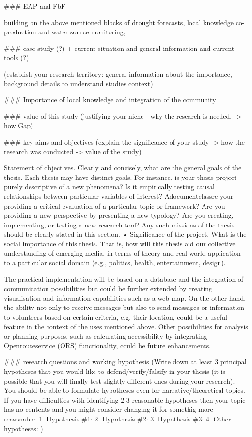 \#\#\# EAP and FbF

building on the above mentioned blocks of drought forecasts, local knowledge co-production and water source monitoring, 

\#\#\# case study (?) + current situation and general information and current tools (?)

(establish your research territory: general information about the importance, background details to understand studies context)


\#\#\# Importance of local knowledge and integration of the community

\#\#\# value of this study
(justifying your niche - why the research is needed. -> how Gap)

\#\#\# key aims and objectives
(explain the significance of your study -> how the research was conducted -> value of the study)

Statement of objectives. Clearly and concisely, what are the general goals of the
thesis. Each thesis may have distinct goals. For instance, is your thesis project purely
descriptive of a new phenomena? Is it empirically testing causal relationships
between particular variables of interest? Adocumentclassre your providing a critical evaluation of a
particular topic or framework? Are you providing a new perspective by presenting a
new typology? Are you creating, implementing, or testing a new research tool? Any
such missions of the thesis should be clearly stated in this section.
• Significance of the project. What is the social importance of this thesis. That is, how
will this thesis aid our collective understanding of emerging media, in terms of
theory and real-world application to a particular social domain (e.g., politics, health,
entertainment, design).




The practical implementation will be based on a database and the integration of communication possibilities but could be further extended by creating visualisation and information capabilities such as a web map. On the other hand, the ability not only to receive messages but also to send messages or information to volunteers based on certain criteria, e.g. their location, could be a useful feature in the context of the uses mentioned above. Other possibilities for analysis or planning purposes, such as calculating accessibility by integrating Openrouteservice (ORS) functionality, could be future enhancements.




\#\#\# research questions and working hypothesis
(Write down at least 3 principal hypotheses that you would like to defend/verify/falsify in your thesis (it is possible that you will finally test slightly different ones during your research). You should be able to formulate hypotheses even for narrative/theoretical topics. If you have difficulties with identifying 2-3 reasonable hypotheses then your topic has no contents and you might consider changing it for somethig more reasonable.
1.	Hypothesis \#1:
2.	Hypothesis \#2:
3.	Hypothesis \#3:
4.	Other hypotheses:
)


